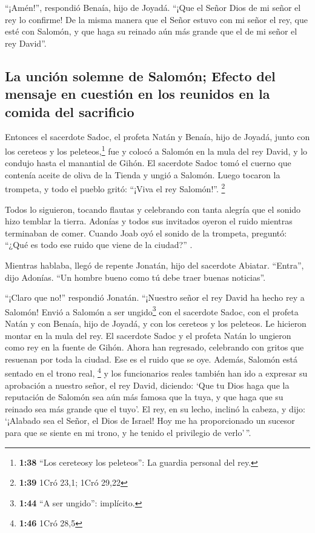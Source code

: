  ``¡Amén!'', respondió Benaía, hijo de Joyadá. ``¡Que el
Señor Dios de mi señor el rey lo confirme!  De la misma
manera que el Señor estuvo con mi señor el rey, que esté con Salomón, y
que haga su reinado aún más grande que el de mi señor el rey David''.

\hypertarget{la-unciuxf3n-solemne-de-salomuxf3n-efecto-del-mensaje-en-cuestiuxf3n-en-los-reunidos-en-la-comida-del-sacrificio}{%
\subsection{La unción solemne de Salomón; Efecto del mensaje en cuestión
en los reunidos en la comida del
sacrificio}\label{la-unciuxf3n-solemne-de-salomuxf3n-efecto-del-mensaje-en-cuestiuxf3n-en-los-reunidos-en-la-comida-del-sacrificio}}

 Entonces el sacerdote Sadoc, el profeta Natán y Benaía,
hijo de Joyadá, junto con los cereteos y los peleteos,\footnote{\textbf{1:38}
  ``Los cereteosy los peleteos'': La guardia personal del rey.} fue y
colocó a Salomón en la mula del rey David, y lo condujo hasta el
manantial de Gihón.  El sacerdote Sadoc tomó el cuerno
que contenía aceite de oliva de la Tienda y ungió a Salomón. Luego
tocaron la trompeta, y todo el pueblo gritó: ``¡Viva el rey Salomón!''.
\footnote{\textbf{1:39} 1Cró 23,1; 1Cró 29,22}

 Todos lo siguieron, tocando flautas y celebrando con
tanta alegría que el sonido hizo temblar la tierra. 
Adonías y todos sus invitados oyeron el ruido mientras terminaban de
comer. Cuando Joab oyó el sonido de la trompeta, preguntó: ``¿Qué es
todo ese ruido que viene de la ciudad?'' .

 Mientras hablaba, llegó de repente Jonatán, hijo del
sacerdote Abiatar. ``Entra'', dijo Adonías. ``Un hombre bueno como tú
debe traer buenas noticias''.

 ``¡Claro que no!'' respondió Jonatán. ``¡Nuestro señor
el rey David ha hecho rey a Salomón!  Envió a Salomón a
ser ungido\footnote{\textbf{1:44} ``A ser ungido'': implícito.} con el
sacerdote Sadoc, con el profeta Natán y con Benaía, hijo de Joyadá, y
con los cereteos y los peleteos. Le hicieron montar en la mula del rey.
 El sacerdote Sadoc y el profeta Natán lo ungieron como
rey en la fuente de Gihón. Ahora han regresado, celebrando con gritos
que resuenan por toda la ciudad. Ese es el ruido que se oye.
 Además, Salomón está sentado en el trono real,
\footnote{\textbf{1:46} 1Cró 28,5}  y los funcionarios
reales también han ido a expresar su aprobación a nuestro señor, el rey
David, diciendo: `Que tu Dios haga que la reputación de Salomón sea aún
más famosa que la tuya, y que haga que su reinado sea más grande que el
tuyo'. El rey, en su lecho, inclinó la cabeza,  y dijo:
`¡Alabado sea el Señor, el Dios de Israel! Hoy me ha proporcionado un
sucesor para que se siente en mi trono, y he tenido el privilegio de
verlo'\,''.

